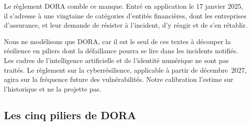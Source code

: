 Le règlement DORA \citep{DORA2022} comble ce manque. Entré en application le $17$ janvier $2025$, il
s'adresse à une vingtaine de catégories d'entités financières, dont les entreprises d'assurance, et
leur demande de résister à l'incident, d'y réagir et de s'en rétablir. 

Nous ne modélisons que DORA, car il est le seul de ces textes à découper la résilience en piliers
dont la défaillance pourra se lire dans les incidents notifiés. Les cadres de l'intelligence
artificielle et de l'identité numérique ne sont pas traités. Le règlement sur la cyberrésilience,
applicable à partir de décembre~$2027$, agira sur la fréquence future des vulnérabilités. Notre calibration l'estime sur l'historique et ne la projette pas.

\subsection{Les cinq piliers de DORA}
\label{subsec:cinq-piliers-dora}

